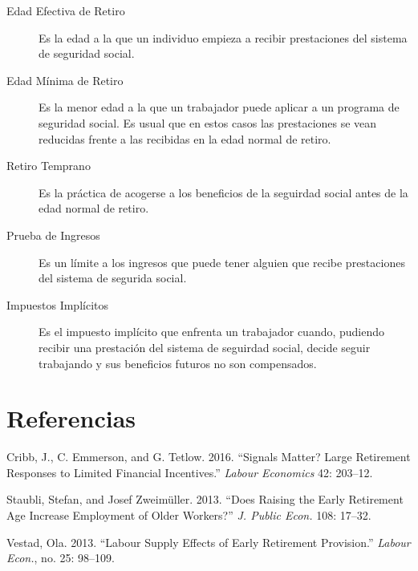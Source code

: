 \documentclass[]{article}
\begin{document}
\begin{description}
\item[Edad Efectiva de Retiro]
Es la edad a la que un individuo empieza a recibir prestaciones del
sistema de seguridad social.
\item[Edad Mínima de Retiro]
Es la menor edad a la que un trabajador puede aplicar a un programa de
seguridad social. Es usual que en estos casos las prestaciones se vean
reducidas frente a las recibidas en la edad normal de retiro.
\item[Retiro Temprano]
Es la práctica de acogerse a los beneficios de la seguirdad social antes
de la edad normal de retiro.
\item[Prueba de Ingresos]
Es un límite a los ingresos que puede tener alguien que recibe
prestaciones del sistema de segurida social.
\item[Impuestos Implícitos]
Es el impuesto implícito que enfrenta un trabajador cuando, pudiendo
recibir una prestación del sistema de seguirdad social, decide seguir
trabajando y sus beneficios futuros no son compensados.
\end{description}

\hypertarget{referencias}{%
\section*{Referencias}\label{referencias}}

\hypertarget{refs}{}
\leavevmode\hypertarget{ref-cribb16}{}%
Cribb, J., C. Emmerson, and G. Tetlow. 2016. ``Signals Matter? Large
Retirement Responses to Limited Financial Incentives.'' \emph{Labour
Economics} 42: 203--12.

\leavevmode\hypertarget{ref-staubli13}{}%
Staubli, Stefan, and Josef Zweimüller. 2013. ``Does Raising the Early
Retirement Age Increase Employment of Older Workers?'' \emph{J. Public
Econ.} 108: 17--32.

\leavevmode\hypertarget{ref-vestad13}{}%
Vestad, Ola. 2013. ``Labour Supply Effects of Early Retirement
Provision.'' \emph{Labour Econ.}, no. 25: 98--109.
\end{document}
